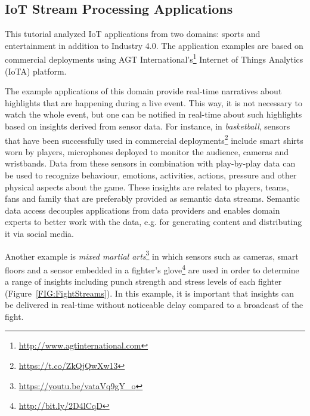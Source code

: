 \subsection{IoT Stream Processing Applications}
This tutorial analyzed IoT applications from two domains: sports and entertainment in addition to Industry 4.0. The application examples are based on commercial deployments using AGT International's\footnote{\url{http://www.agtinternational.com}} Internet of Things Analytics (IoTA) platform.

The example applications of this domain provide real-time narratives about highlights that are happening during a live event. This way, it is not necessary to watch the whole event, but one can be notified in real-time about such highlights based on insights derived from sensor data. For instance, in \emph{basketball}, sensors that have been successfully used in commercial deployments\footnote{\url{https://t.co/ZkQjQwXw13}} include smart shirts worn by players, microphones deployed to monitor the audience,  cameras and wristbands. Data from these sensors in combination with play-by-play data can be used to recognize behaviour, emotions, activities, actions, pressure and other physical aspects about the game. These insights are related to players, teams, fans and family that are preferably provided as semantic data streams. Semantic data access decouples applications from data providers and enables domain experts to better work with the data, e.g. for generating content and distributing it via social media.

Another example is \emph{mixed martial arts}\footnote{\url{https://youtu.be/vataVq9gY_o}} in which sensors such as cameras, smart floors and a sensor embedded in a fighter's glove\footnote{\url{http://bit.ly/2D4lCqD}} are used in order to determine a range of insights including punch strength and stress levels of each fighter (Figure~\ref{FIG:FightStreams}). In this example, it is important that insights can be delivered in real-time without noticeable delay compared to a broadcast of the fight.

